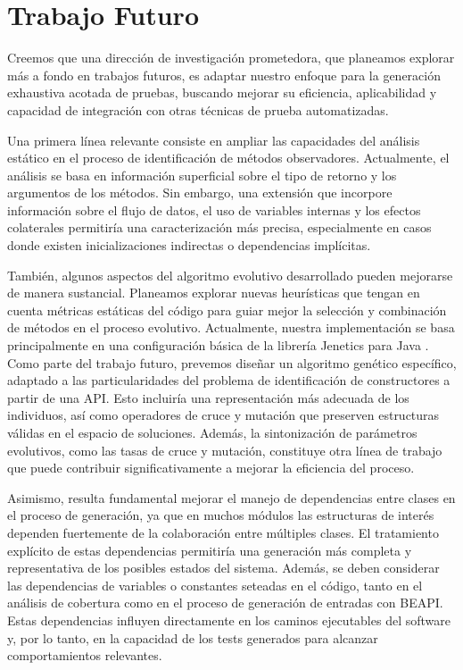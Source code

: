 \chapter{Trabajo Futuro}
\label{cap:future}

Creemos que una dirección de investigación prometedora, que planeamos explorar más a fondo en trabajos futuros, 
es adaptar nuestro enfoque para la generación exhaustiva acotada de pruebas, buscando mejorar su eficiencia, aplicabilidad y capacidad de integración con otras técnicas de prueba automatizadas.

Una primera línea relevante consiste en ampliar las capacidades del análisis estático en el proceso de identificación de métodos observadores. 
Actualmente, el análisis se basa en información superficial sobre el tipo de retorno y los argumentos de los métodos. 
Sin embargo, una extensión que incorpore información sobre el flujo de datos, el uso de variables internas y los efectos colaterales permitiría una caracterización más precisa, 
especialmente en casos donde existen inicializaciones indirectas o dependencias implícitas.

También, algunos aspectos del algoritmo evolutivo desarrollado pueden mejorarse de manera sustancial. 
Planeamos explorar nuevas heurísticas que tengan en cuenta métricas estáticas del código para guiar mejor la selección y combinación de métodos en el proceso evolutivo. 
Actualmente, nuestra implementación se basa principalmente en una configuración básica de la librería Jenetics para Java \cite{jenetics}. 
Como parte del trabajo futuro, prevemos diseñar un algoritmo genético específico, adaptado a las particularidades del problema de identificación de constructores a partir de una API. 
Esto incluiría una representación más adecuada de los individuos, así como operadores de cruce y mutación que preserven estructuras válidas en el espacio de soluciones. 
Además, la sintonización de parámetros evolutivos, como las tasas de cruce y mutación, constituye otra línea de trabajo que puede contribuir significativamente a mejorar la eficiencia del proceso.

Asimismo, resulta fundamental mejorar el manejo de dependencias entre clases en el proceso de generación, 
ya que en muchos módulos las estructuras de interés dependen fuertemente de la colaboración entre múltiples clases. 
El tratamiento explícito de estas dependencias permitiría una generación más completa y representativa de los posibles estados del sistema. 
Además, se deben considerar las dependencias de variables o constantes seteadas en el código, tanto en el análisis de cobertura como en el proceso de generación de entradas con BEAPI. 
Estas dependencias influyen directamente en los caminos ejecutables del software y, por lo tanto, en la capacidad de los tests generados para alcanzar comportamientos relevantes.

